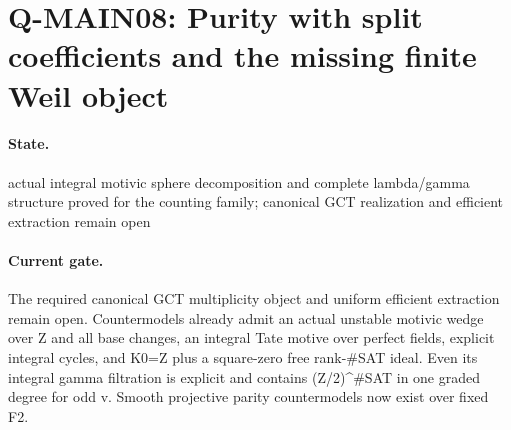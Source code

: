 \section{Q-MAIN08: Purity with split coefficients and the missing finite Weil object}
\paragraph{State.} actual integral motivic sphere decomposition and complete lambda/gamma structure proved for the counting family; canonical GCT realization and efficient extraction remain open
\paragraph{Current gate.} The required canonical GCT multiplicity object and uniform efficient extraction remain open. Countermodels already admit an actual unstable motivic wedge over Z and all base changes, an integral Tate motive over perfect fields, explicit integral cycles, and K0=Z plus a square-zero free rank-\#SAT ideal. Even its integral gamma filtration is explicit and contains (Z/2)\textasciicircum{}\#SAT in one graded degree for odd v. Smooth projective parity countermodels now exist over fixed F2.
